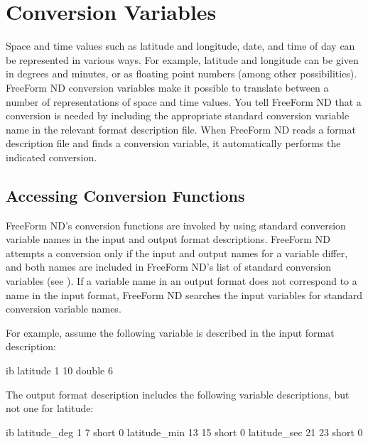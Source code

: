 %
%

\chapter{Conversion Variables}
\label{ff,convvars}

Space and time values such as latitude and longitude, date, and time
of day can be represented in various ways. For example, latitude and
longitude can be given in degrees and minutes, or as floating point
numbers (among other possibilities). FreeForm ND conversion variables
make it possible to translate between a number of representations of
space and time values. You tell FreeForm ND that a conversion is
needed by including the appropriate standard conversion variable name
in the relevant format description file. When FreeForm ND reads a
format description file and finds a conversion variable, it
automatically performs the indicated conversion.

\section{Accessing Conversion Functions}

FreeForm ND's conversion functions are invoked by using standard
conversion variable names in the input and output format descriptions.
FreeForm ND attempts a conversion only if the input and output names
for a variable differ, and both names are included in FreeForm ND's
list of standard conversion variables (see ).
If a variable name in an output format does not correspond to a name
in the input format, FreeForm ND searches the input variables for
standard conversion variable names.

For example, assume the following variable is described in the input
format description:

\begin{vcode}{ib}
latitude 1 10 double 6 
\end{vcode}

The output format description includes the following variable
descriptions, but not one for latitude:

\begin{vcode}{ib}
latitude_deg 1 7 short 0
latitude_min 13 15 short 0
latitude_sec 21 23 short 0
\end{vcode}

